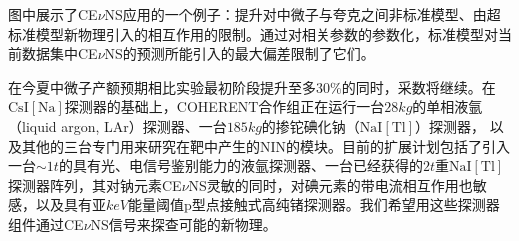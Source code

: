 \begin{translation}
图中展示了CE$\nu$NS应用的一个例子：提升对中微子与夸克之间非标准模型、由超标准模型新物理引入的相互作用的限制。通过对相关参数的参数化，标准模型对当前数据集中CE$\nu$NS的预测所能引入的最大偏差限制了它们。

在今夏中微子产额预期相比实验最初阶段提升至多30\%的同时，采数将继续。在$\mathrm{CsI[Na]}$探测器的基础上，COHERENT合作组正在运行一台$28\si{kg}$的单相液氩（liquid argon, LAr）探测器、一台$185\si{kg}$的掺铊碘化钠（$\mathrm{NaI[Tl]}$）探测器，
以及其他的三台专门用来研究在靶中产生的NIN的模块。目前的扩展计划包括了引入一台$\sim 1\si{t}$的具有光、电信号鉴别能力的液氩探测器、一台已经获得的$2\si{t}$重$\mathrm{NaI[Tl]}$探测器阵列，其对钠元素CE$\nu$NS灵敏的同时，对碘元素的带电流相互作用也敏感，以及具有亚$\si{keV}$能量阈值p型点接触式高纯锗探测器。我们希望用这些探测器组件通过CE$\nu$NS信号来探查可能的新物理。




\begin{translation-index}
  \nocite{akimov_observation_2017}
  
  
\end{translation-index}

\end{translation}
